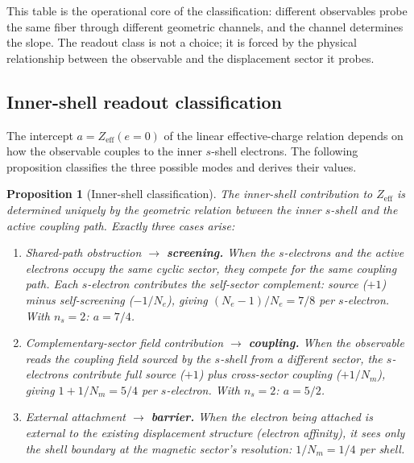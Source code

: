 \documentclass[11pt,a4paper]{article}
\newtheorem{proposition}[theorem]{Proposition}
\begin{document}
This table is the operational core of the classification: different observables probe the same fiber through different geometric channels, and the channel determines the slope. The readout class is not a choice; it is forced by the physical relationship between the observable and the displacement sector it probes.

\subsection{Inner-shell readout classification}
\label{sec:inner-shell}

The intercept $a = Z_{\mathrm{eff}}(e = 0)$ of the linear effective-charge relation depends on how the observable couples to the inner $s$-shell electrons. The following proposition classifies the three possible modes and derives their values.

\begin{proposition}[Inner-shell classification]
\label{prop:inner-shell}
The inner-shell contribution to $Z_{\mathrm{eff}}$ is determined uniquely by the geometric relation between the inner $s$-shell and the active coupling path. Exactly three cases arise:

\begin{enumerate}[label=(\roman*)]
\item \emph{Shared-path obstruction} $\to$ \textbf{screening.} When the $s$-electrons and the active electrons occupy the same cyclic sector, they compete for the same coupling path. Each $s$-electron contributes the self-sector complement: source ($+1$) minus self-screening ($-1/N_e$), giving $(N_e - 1)/N_e = 7/8$ per $s$-electron. With $n_s = 2$: $a = 7/4$.

\item \emph{Complementary-sector field contribution} $\to$ \textbf{coupling.} When the observable reads the coupling field sourced by the $s$-shell from a different sector, the $s$-electrons contribute full source ($+1$) plus cross-sector coupling ($+1/N_m$), giving $1 + 1/N_m = 5/4$ per $s$-electron. With $n_s = 2$: $a = 5/2$.

\item \emph{External attachment} $\to$ \textbf{barrier.} When the electron being attached is external to the existing displacement structure (electron affinity), it sees only the shell boundary at the magnetic sector's resolution: $1/N_m = 1/4$ per shell.
\end{enumerate}
\end{proposition}
\end{document}
